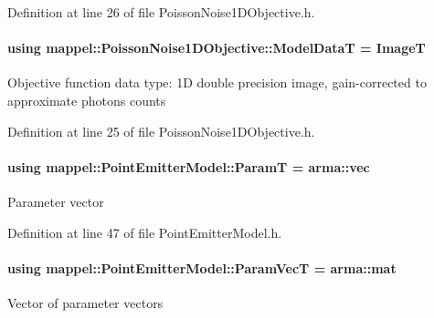 Definition at line 26 of file Poisson\+Noise1\+D\+Objective.\+h.

\paragraph[{\texorpdfstring{Model\+DataT}{ModelDataT}}]{\setlength{\rightskip}{0pt plus 5cm}using {\bf mappel\+::\+Poisson\+Noise1\+D\+Objective\+::\+Model\+DataT} =  {\bf ImageT}\hspace{0.3cm}{\ttfamily [inherited]}}\hypertarget{classmappel_1_1PoissonNoise1DObjective_a0f72eebcb9fb785a5489fc5489bff9b0}{}\label{classmappel_1_1PoissonNoise1DObjective_a0f72eebcb9fb785a5489fc5489bff9b0}
Objective function data type\+: 1D double precision image, gain-\/corrected to approximate photons counts 

Definition at line 25 of file Poisson\+Noise1\+D\+Objective.\+h.

\paragraph[{\texorpdfstring{ParamT}{ParamT}}]{\setlength{\rightskip}{0pt plus 5cm}using {\bf mappel\+::\+Point\+Emitter\+Model\+::\+ParamT} =  arma\+::vec\hspace{0.3cm}{\ttfamily [inherited]}}\hypertarget{classmappel_1_1PointEmitterModel_a665ec6aea3aac139bb69a23c06d4b9a1}{}\label{classmappel_1_1PointEmitterModel_a665ec6aea3aac139bb69a23c06d4b9a1}
Parameter vector 

Definition at line 47 of file Point\+Emitter\+Model.\+h.

\paragraph[{\texorpdfstring{Param\+VecT}{ParamVecT}}]{\setlength{\rightskip}{0pt plus 5cm}using {\bf mappel\+::\+Point\+Emitter\+Model\+::\+Param\+VecT} =  arma\+::mat\hspace{0.3cm}{\ttfamily [inherited]}}\hypertarget{classmappel_1_1PointEmitterModel_add253b568d763f1513a810aac35de719}{}\label{classmappel_1_1PointEmitterModel_add253b568d763f1513a810aac35de719}
Vector of parameter vectors 

